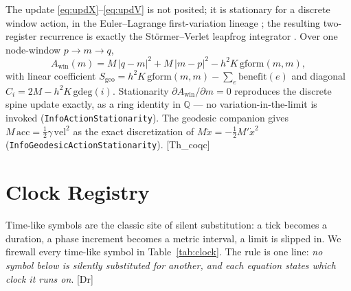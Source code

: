 \documentclass[10pt,twocolumn]{article}
\theoremstyle{definition}
\newcommand{\Thq}{\textsf{[Th\_coqc]}}
\newcommand{\Dr}{\textsf{[Dr]}}
\newcommand{\code}[1]{\texttt{#1}}
\begin{document}
The update \eqref{eq:updX}--\eqref{eq:updV} is not posited; it is stationary for a discrete
window action, in the Euler--Lagrange first-variation lineage \cite{euler1744,lagrange1788};
the resulting two-register recurrence is exactly the St\"ormer--Verlet leapfrog integrator
\cite{stormer1907,verlet1967}. Over one node-window $p\to m\to q$,
\begin{equation}\label{eq:action}
A_{\mathrm{win}}(m) = M\,|q-m|^2 + M\,|m-p|^2 - h^2 K\,\mathrm{gform}(m,m),
\end{equation}
with linear coefficient $S_{\mathrm{geo}} = h^2 K\,\mathrm{gform}(m,m) - \sum_{e}
\mathrm{benefit}(e)$ and diagonal $C_i = 2M - h^2 K\,\mathrm{gdeg}(i)$. Stationarity
$\partial A_{\mathrm{win}}/\partial m = 0$ reproduces the discrete spine update exactly, as
a ring identity in $\mathbb{Q}$ --- no variation-in-the-limit is invoked
(\code{InfoActionStationarity}). The geodesic companion gives
$M\,\mathrm{acc} = \tfrac12\gamma\,\mathrm{vel}^2$ as the exact discretization of
$M\ddot{x} = -\tfrac12 M'\dot{x}^2$ (\code{InfoGeodesicActionStationarity}). \Thq{}

\section{Clock Registry}\label{sec:clock}

Time-like symbols are the classic site of silent substitution: a tick becomes a duration,
a phase increment becomes a metric interval, a limit is slipped in. We firewall every
time-like symbol in Table~\ref{tab:clock}. The rule is one line: \emph{no symbol below is
silently substituted for another, and each equation states which clock it runs on}. \Dr{}
\end{document}

